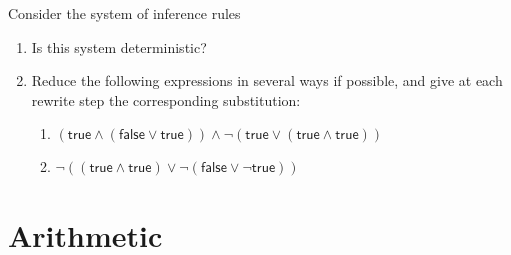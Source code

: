 \documentclass[11pt,a4paper]{article}
\newcommand{\true}{\textsf{true}\xspace}
\newcommand{\false}{\textsf{false}\xspace}
\newcommand\rname[1]{\langle{#1}\rangle}
\begin{document}
Consider the system of inference rules

\begin{enumerate}

  \item Is this system deterministic?

  \item Reduce the following expressions in several ways if possible,
    and give at each rewrite step the corresponding substitution:
  \begin{enumerate}
 
    \item \((\true \wedge (\false \vee \true)) \wedge \neg(\true \vee
      (\true \wedge \true))\)

    \item \(\neg((\true \wedge \true) \vee \neg(\false \vee \neg\true))\)

  \end{enumerate}

\end{enumerate}


\section{Arithmetic}
\end{document}
